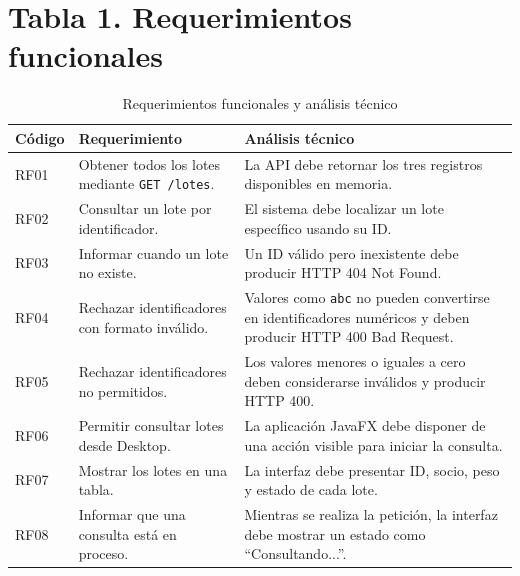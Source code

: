 \documentclass[12pt,letterpaper]{article}
\begin{document}
\begin{center}
\end{center}

\section{Tabla 1. Requerimientos funcionales}
\begin{table}[!ht]
\centering
\caption{Requerimientos funcionales y análisis técnico}
\label{tab:funcionales}
\small\singlespacing
{}
\begin{tabularx}{\textwidth}{@{}P{1.25cm}P{4.05cm}Y@{}}
\toprule
{}\color{white}\textbf{Código} & \color{white}\textbf{Requerimiento} & \color{white}\textbf{Análisis técnico}\\
\midrule
RF01 & Obtener todos los lotes mediante \texttt{GET /lotes}. & La API debe retornar los tres registros disponibles en memoria.\\
RF02 & Consultar un lote por identificador. & El sistema debe localizar un lote específico usando su ID.\\
RF03 & Informar cuando un lote no existe. & Un ID válido pero inexistente debe producir HTTP 404 Not Found.\\
RF04 & Rechazar identificadores con formato inválido. & Valores como \texttt{abc} no pueden convertirse en identificadores numéricos y deben producir HTTP 400 Bad Request.\\
RF05 & Rechazar identificadores no permitidos. & Los valores menores o iguales a cero deben considerarse inválidos y producir HTTP 400.\\
RF06 & Permitir consultar lotes desde Desktop. & La aplicación JavaFX debe disponer de una acción visible para iniciar la consulta.\\
RF07 & Mostrar los lotes en una tabla. & La interfaz debe presentar ID, socio, peso y estado de cada lote.\\
RF08 & Informar que una consulta está en proceso. & Mientras se realiza la petición, la interfaz debe mostrar un estado como “Consultando...”.\\

\end{tabularx}
\end{table}
\end{document}
